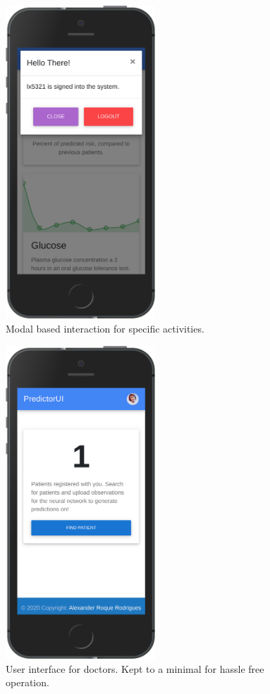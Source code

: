 \documentclass[12pt]{article}
\begin{document}
\begin{figure}[ht]
\centering
\includegraphics[width=0.5\textwidth]{5se.png}
\caption{\label{fig:54} Modal based interaction for specific activities.}
\end{figure}
\begin{figure}[ht]
\centering
\includegraphics[width=0.5\textwidth]{6se.png}
\caption{\label{fig:55} User interface for doctors. Kept to a minimal for hassle free operation.}
\end{figure}
\end{document}
